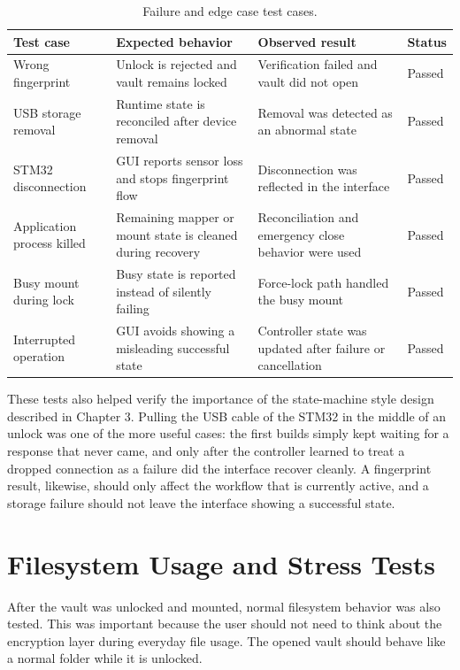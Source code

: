 \begin{table}[!htbp]
\centering
\caption{\label{tab:failure-tests}Failure and edge case test cases.}
\small
\begin{tabularx}{\textwidth}{lXXX}
\toprule
Test case & Expected behavior & Observed result & Status\\
\midrule
Wrong fingerprint & Unlock is rejected and vault remains locked & Verification failed and vault did not open & Passed\\
USB storage removal & Runtime state is reconciled after device removal & Removal was detected as an abnormal state & Passed\\
STM32 disconnection & GUI reports sensor loss and stops fingerprint flow & Disconnection was reflected in the interface & Passed\\
Application process killed & Remaining mapper or mount state is cleaned during recovery & Reconciliation and emergency close behavior were used & Passed\\
Busy mount during lock & Busy state is reported instead of silently failing & Force-lock path handled the busy mount & Passed\\
Interrupted operation & GUI avoids showing a misleading successful state & Controller state was updated after failure or cancellation & Passed\\
\bottomrule
\end{tabularx}
\end{table}

These tests also helped verify the importance of the state-machine style design described in Chapter 3. Pulling the USB cable of the STM32 in the middle of an unlock was one of the more useful cases: the first builds simply kept waiting for a response that never came, and only after the controller learned to treat a dropped connection as a failure did the interface recover cleanly. A fingerprint result, likewise, should only affect the workflow that is currently active, and a storage failure should not leave the interface showing a successful state.

\section{Filesystem Usage and Stress Tests}

After the vault was unlocked and mounted, normal filesystem behavior was also tested. This was important because the user should not need to think about the encryption layer during everyday file usage. The opened vault should behave like a normal folder while it is unlocked.


